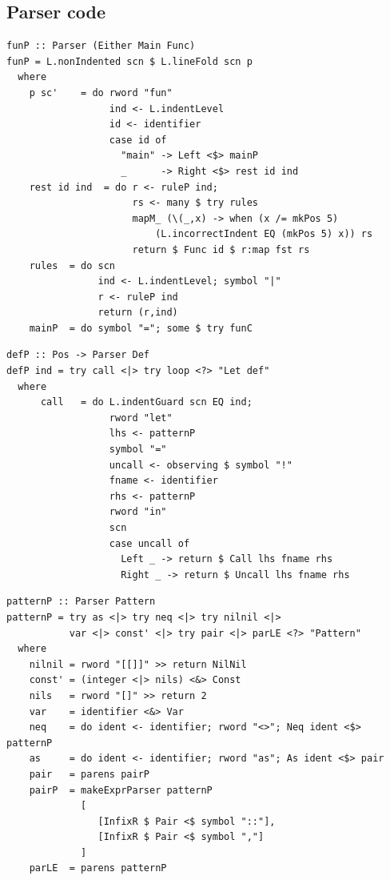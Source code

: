 \documentclass[a4paper]{article}
\begin{document}
\begin{appendix}
\section{Parser code}
\label{appParse}
\begin{verbatim}
funP :: Parser (Either Main Func)
funP = L.nonIndented scn $ L.lineFold scn p
  where
    p sc'    = do rword "fun"
                  ind <- L.indentLevel
                  id <- identifier
                  case id of
                    "main" -> Left <$> mainP
                    _      -> Right <$> rest id ind
    rest id ind  = do r <- ruleP ind;
                      rs <- many $ try rules
                      mapM_ (\(_,x) -> when (x /= mkPos 5)
                          (L.incorrectIndent EQ (mkPos 5) x)) rs
                      return $ Func id $ r:map fst rs
    rules  = do scn
                ind <- L.indentLevel; symbol "|"
                r <- ruleP ind
                return (r,ind)
    mainP  = do symbol "="; some $ try funC
\end{verbatim}
\begin{verbatim}
defP :: Pos -> Parser Def
defP ind = try call <|> try loop <?> "Let def"
  where
      call   = do L.indentGuard scn EQ ind;
                  rword "let"
                  lhs <- patternP
                  symbol "="
                  uncall <- observing $ symbol "!"
                  fname <- identifier
                  rhs <- patternP
                  rword "in"
                  scn
                  case uncall of
                    Left _ -> return $ Call lhs fname rhs
                    Right _ -> return $ Uncall lhs fname rhs
\end{verbatim}
\begin{verbatim}
patternP :: Parser Pattern
patternP = try as <|> try neq <|> try nilnil <|>
           var <|> const' <|> try pair <|> parLE <?> "Pattern"
  where
    nilnil = rword "[[]]" >> return NilNil
    const' = (integer <|> nils) <&> Const
    nils   = rword "[]" >> return 2
    var    = identifier <&> Var
    neq    = do ident <- identifier; rword "<>"; Neq ident <$> patternP
    as     = do ident <- identifier; rword "as"; As ident <$> pair
    pair   = parens pairP
    pairP  = makeExprParser patternP
             [
                [InfixR $ Pair <$ symbol "::"],
                [InfixR $ Pair <$ symbol ","]
             ]
    parLE  = parens patternP
\end{verbatim}
\end{appendix}
\end{document}
